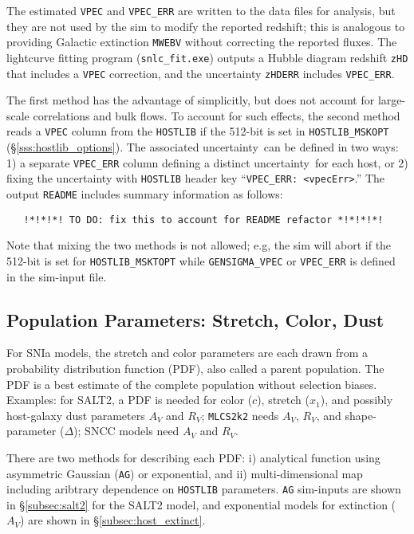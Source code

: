 \documentclass[12pt]{article}
\newcommand{\unc}{uncertainty}
\newcommand{\mlcs}{{\tt MLCS2k2}}
\begin{document}
The estimated {\tt VPEC} and {\tt VPEC\_ERR} are written to the 
data files for analysis, but they are not used by the sim to modify 
the reported redshift; this is analogous to providing 
Galactic extinction {\tt MWEBV} without correcting the reported fluxes.
The lightcurve fitting program ({\tt snlc\_fit.exe}) 
outputs a Hubble diagram redshift {\tt zHD} that includes a
{\tt VPEC} correction, and the uncertainty {\tt zHDERR} includes
{\tt VPEC\_ERR}.


The first method has the advantage of simplicitly, but does not
account for large-scale correlations and bulk flows.
To account for such effects, the second method reads a {\tt VPEC} 
column from the {\tt HOSTLIB} if the 512-bit is set in 
{\tt HOSTLIB\_MSKOPT} (\S\ref{sss:hostlib_options}). 
The associated \unc\ can be defined in two ways:
1) a separate {\tt VPEC\_ERR} column 
   defining a distinct \unc\ for each host, or 
2) fixing the uncertainty with {\tt HOSTLIB} header key 
``{\tt VPEC\_ERR: <vpecErr>}.''
The output {\tt README} includes summary information as follows:
\begin{verbatim}
   !*!*!*! TO DO: fix this to account for README refactor *!*!*!*!
\end{verbatim}


Note that mixing the two methods is not allowed;
e.g, the sim will abort if the 512-bit is set for {\tt HOSTLIB\_MSKTOPT}
while {\tt GENSIGMA\_VPEC} or {\tt VPEC\_ERR} 
is defined in the sim-input file.

   \clearpage
   \subsection{Population Parameters: Stretch, Color, Dust}
   \label{subsec:genPDF}
\newcommand{\AG}{{\tt AG}}

For SNIa models, the stretch and color parameters are each drawn from a
probability distribution function (PDF), also called a parent population.
The PDF is a best estimate of the complete population without selection
biases. Examples: 
for SALT2, a PDF is needed for color ($c$), stretch ($x_1$),
and possibly host-galaxy dust parameters $A_V$ and $R_V$;
{\mlcs} needs $A_V$, $R_V$, and shape-parameter ($\Delta$);
SNCC models need $A_V$ and $R_V$.

There are two methods for describing each PDF:
i) analytical function using asymmetric Gaussian (\AG) or exponential, and
ii) multi-dimensional map including aribtrary dependence on
{\tt HOSTLIB} parameters.
{\AG} sim-inputs are shown in \S\ref{subsec:salt2} for the SALT2 model,
and exponential models for extinction ($A_V$)
are shown in \S\ref{subsec:host_extinct}.
\end{document}
